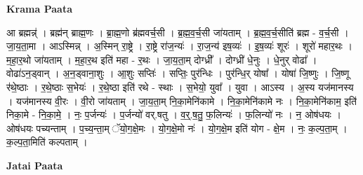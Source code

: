 \documentclass[17pt]{extarticle}
\begin{document}
\textbf{Krama Paata} \newline

आ ब्रह्मन्न्॑ । ब्रह्म॑न् ब्राह्म॒णः । ब्रा॒ह्म॒णो ब्र॑ह्मवर्च॒सी । ब्र॒ह्म॒व॒र्च॒सी जा॑यताम् । ब्र॒ह्म॒व॒र्च॒सीति॑ ब्रह्म - व॒र्च॒सी । जा॒य॒ता॒मा । आऽस्मिन्न् । अ॒स्मिन् रा॒ष्ट्रे । रा॒ष्ट्रे रा॑ज॒न्यः॑ । रा॒ज॒न्य॑ इष॒व्यः॑ । इ॒ष॒व्यः॑ शूरः॑ । शूरो॑ महार॒थः । म॒हा॒र॒थो जा॑यताम् । म॒हा॒र॒थ इति॑ महा - र॒थः । जा॒य॒ता॒म् दोग्ध्री᳚ । दोग्ध्री॑ धे॒नुः । धे॒नुर् वोढा᳚ । वोढा॑ऽन॒ड्वान् । अ॒न॒ड्वाना॒शुः । आ॒शुः सप्तिः॑ । सप्तिः॒ पुर॑न्धिः । पुर॑न्धि॒र् योषा᳚ । योषा॑ जि॒ष्णुः । जि॒ष्णू र॑थे॒ष्ठाः । र॒थे॒ष्ठाः स॒भेयः॑ । र॒थे॒ष्ठा इति॑ रथे - स्थाः । स॒भेयो॒ युवा᳚ । युवा । आऽस्य । अ॒स्य यज॑मानस्य । यज॑मानस्य वी॒रः । वी॒रो जा॑यताम् । जा॒य॒ता॒म् नि॒का॒मेनि॑कामे । नि॒का॒मेनि॑कामे नः । नि॒का॒मेनि॑काम॒ इति॑ निका॒मे - नि॒का॒मे॒ । नः॒ प॒र्जन्यः॑ । प॒र्जन्यो॑ वर्.षतु । व॒र्॒.ष॒तु॒ फ॒लिन्यः॑ । फ॒लिन्यो॑ नः । न॒ ओष॑धयः । ओष॑धयः पच्यन्ताम् । प॒च्य॒न्ता॒म् ॅयो॒ग॒क्षे॒मः । यो॒ग॒क्षे॒मो नः॑ । यो॒ग॒क्षे॒म इति॑ योग - क्षे॒म । नः॒ क॒ल्प॒ता॒म् । क॒ल्प॒ता॒मिति॑ कल्पताम् । \newline

\textbf{Jatai Paata} \newline
\end{document}
